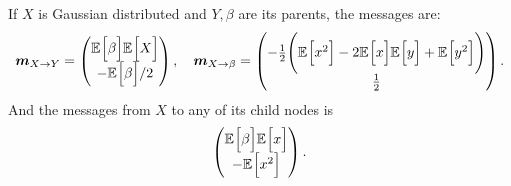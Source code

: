 \begin{exampleth}
     If \( X \) is Gaussian distributed and \( Y, \beta \) are its parents, the messages are:
     \[
           \bm{m}_{X \to Y} = \begin{pmatrix}
                \mathbb{E}_{}\Big[\beta\Big]\mathbb{E}_{}\Big[X\Big]\\
                - \mathbb{E}_{}\Big[\beta\Big]/2
           \end{pmatrix}, \quad
           \bm{m}_{X \to \beta} = \begin{pmatrix}
               -\frac{1}{2}\Bigg( \mathbb{E}_{}\Big[x^2\Big] - 2\mathbb{E}_{}\Big[x\Big]\mathbb{E}_{}\Big[y\Big] + \mathbb{E}_{}\Big[y^2\Big] \Bigg)\\
               \frac{1}{2}
          \end{pmatrix}.
     \]
     And the messages from \( X \) to any of its child nodes is
     \[
          \begin{pmatrix}
               \mathbb{E}_{}\Big[\beta\Big]\mathbb{E}_{}\Big[x\Big]\\
               - \mathbb{E}_{}\Big[x^2\Big]
          \end{pmatrix}.
     \]
\end{exampleth}

